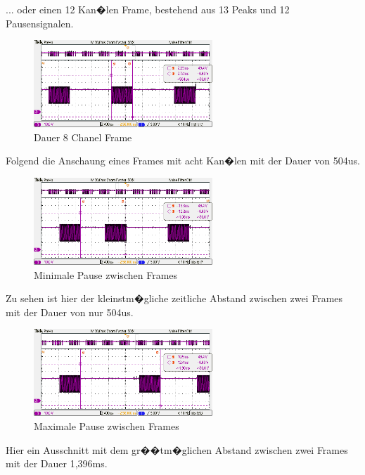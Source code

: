 ... oder einen 12 Kan�len Frame, bestehend aus 13 Peaks und 12 Pausensignalen.

\begin{figure}[H]
\centering
\includegraphics[width=0.6\textwidth]{fig/Controller_Treiber/GraupnerGR16_8_ChX_Gap.png}
\caption[Dauer 8 chanel Frame ]{Dauer 8 Chanel Frame}
\end{figure}

Folgend die Anschaung eines Frames mit acht Kan�len mit der Dauer von 504us.

\begin{figure}[H]
	\centering
	\includegraphics[width=0.6\textwidth]{fig/Controller_Treiber/GraupnerGR16_8_Ch1_Min.png}
	\caption[Minimale Pause zwischen Frames]{Minimale Pause zwischen Frames}
\end{figure}

Zu sehen ist hier der kleinstm�gliche zeitliche Abstand zwischen zwei Frames mit der Dauer von nur 504us.

\begin{figure}[H]
	\centering
	\includegraphics[width=0.6\textwidth]{fig/Controller_Treiber/GraupnerGR16_8_Ch1_Max.png}
	\caption[Maximale Pause zwischen Frames]{Maximale Pause zwischen Frames}
\end{figure}

Hier ein Ausschnitt mit dem gr��tm�glichen Abstand zwischen zwei Frames mit der Dauer 1,396ms.

